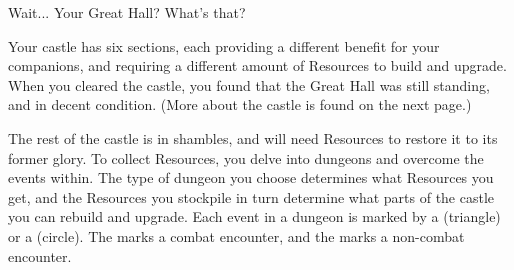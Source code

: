 \skipline

Wait... Your Great Hall? What’s that?

\skipline

Your castle has six sections, each providing a different benefit for your companions, and requiring a different amount of Resources to build and upgrade. When you cleared the castle, you found that the Great Hall was still standing, and in decent condition. (More about the castle is found on the next page.)

\skipline

The rest of the castle is in shambles, and will need Resources to restore it to its former glory. 
To collect Resources, you delve into dungeons and overcome the events within. The type of dungeon you choose determines what Resources you get, and the Resources you stockpile in turn determine what parts of the castle you can rebuild and upgrade. Each event in a dungeon is marked by a \tripip  (triangle) or a \cirpip (circle). The \tripip marks a combat encounter, and the \cirpip marks a non-combat encounter.

\vspace*{\fill}
\begin{adjustbox}{center}
\end{adjustbox}
\vspace*{0pt}
%
